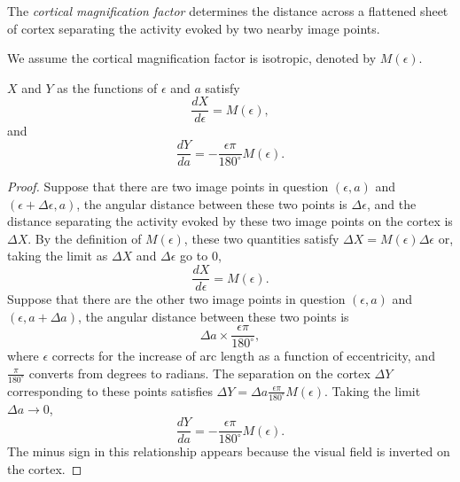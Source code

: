 \begin{defn}
  \label{def:corticalMagnificationFactor}
  The \emph{cortical magnification factor} determines the distance across a flattened sheet of cortex separating the activity evoked by two nearby image points.
\end{defn}

\begin{asm}
  \label{asm:isotropic}
  We assume the cortical magnification factor is isotropic, denoted by $M(\epsilon)$.
\end{asm}

\begin{prop}
  $X$ and $Y$ as the functions of $\epsilon$ and $a$ satisfy
  \begin{equation}
    \label{equ:2.13}
    \frac{dX}{d\epsilon} = M(\epsilon),
  \end{equation}
  and
  \begin{equation}
    \label{equ:2.16}
    \frac{dY}{da} = -\frac{\epsilon\pi}{180^{\circ}}M(\epsilon).
  \end{equation}
\end{prop}
\begin{proof}
  Suppose that there are two image points in question $(\epsilon,a)$ and $(\epsilon+\Delta\epsilon,a)$, the angular distance between these two points is $\Delta\epsilon$, and the distance separating the activity evoked by these two image points on the cortex is $\Delta X$. By the definition of $M(\epsilon)$, these two quantities satisfy $\Delta X = M(\epsilon)\Delta\epsilon$ or, taking the limit as $\Delta X$ and $\Delta\epsilon$ go to $0$,
  \begin{displaymath}
    \frac{dX}{d\epsilon} = M(\epsilon).
  \end{displaymath}
  Suppose that there are the other two image points in question $(\epsilon,a)$ and $(\epsilon,a+\Delta a)$, the angular distance between these two points is
  \begin{displaymath}
    \Delta a \times\frac{\epsilon\pi}{180^{\circ}},
  \end{displaymath}
  where $\epsilon$ corrects for the increase of arc length as a function of eccentricity, and $\frac{\pi}{180^{\circ}}$ converts from degrees to radians. The separation on the cortex $\Delta Y$ corresponding to these points satisfies $\Delta Y = \Delta a \frac{\epsilon\pi}{180^{\circ}}M(\epsilon)$. Taking the limit $\Delta a \to 0$,
  \begin{displaymath}
    \frac{dY}{da} = -\frac{\epsilon\pi}{180^{\circ}}M(\epsilon).
  \end{displaymath}
  The minus sign in this relationship appears because the visual field is inverted on the cortex.
\end{proof}

